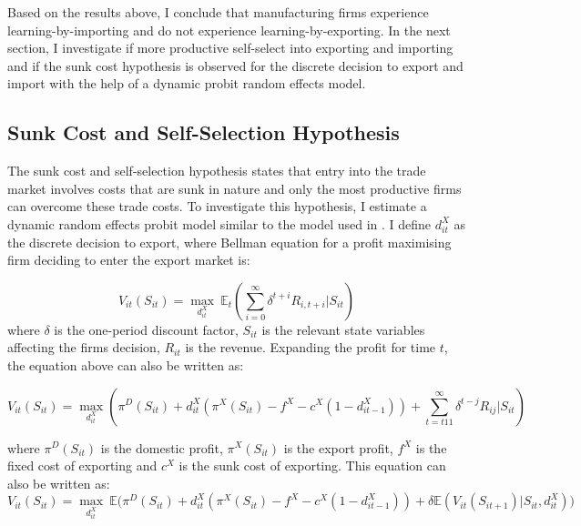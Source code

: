 \documentclass[12pt]{article}
\begin{document}
Based on the results above,  I conclude that manufacturing firms experience learning-by-importing and
do not experience learning-by-exporting. 
In the next section, I investigate if more productive self-select into
exporting and importing and if the sunk cost hypothesis is observed for
the discrete decision to export and import with the help of a dynamic probit
random effects model. 
\newpage
\subsection{Sunk Cost and Self-Selection Hypothesis }\label{sec:ss}

The sunk cost and self-selection hypothesis states that entry into the trade market
involves   costs that are sunk in nature and only the most productive firms can
overcome these trade costs. To investigate this hypothesis, I
estimate a dynamic random effects probit model similar to the model used
in \textcite{roberts1997decision}. I define $d_{it}^{X}$ as the discrete
decision to export, where
 Bellman equation for a profit maximising firm deciding to enter the
 export market is:

 
\begin{equation}
V_{it}(S_{it})= \underset{d_{it}^{X}}{\max}\:  \mathbb{E}_{t}(\sum_{i=0}^{\infty} \delta^{t+i}R_{i,t+i}|S_{it})
\end{equation}
 where $\delta$ is the one-period discount factor, $S_{it}$ is the
 relevant state variables affecting the firms decision, $R_{it}$ is
 the revenue. Expanding the profit for time $t$, the equation above can also be written as:
 
\begin{equation}
V_{it}(S_{it})= \underset{d_{it}^{X}}{\max} (\pi^{D}(S_{it}) + d_{it}^{X}(\pi^{X}(S_{it})- f^{X} -
c^{X}(1-d_{it-1}^{X}))  + \sum_{t=t11}^{\infty} \delta^{t-j}R_{ij}|S_{it})
\end{equation}

where $\pi^{D}(S_{it})$ is the domestic profit, $\pi^{X}(S_{it})$ is the export
profit, $f^{X}$ is the fixed cost of exporting and $c^{X}$ is the sunk
cost of exporting. This equation can also be written as:
\begin{equation}
V_{it}(S_{it})= \underset{d_{it}^{X}}{\max} \:\mathbb{E}
\Big(\pi^{D}(S_{it}) + d_{it}^{X}(\pi^{X}(S_{it}) - f^{X} -
c^{X}(1-d_{it-1}^{X}))  + \delta \mathbb{E} (V_{it}(S_{it+1})|S_{it},
d_{it}^{X}) \Big)
\end{equation}
\end{document}
